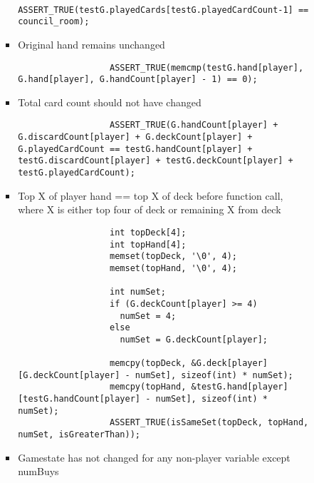 \documentclass[11pt,letterpaper]{article}
\begin{document}
\begin{enumerate}[label=\arabic*., leftmargin=*]
\begin{itemize}[leftmargin=*]
\begin{itemize}[leftmargin=*]
\begin{itemize}[leftmargin=*]
                  \begin{lstlisting}
                  ASSERT_TRUE(testG.playedCards[testG.playedCardCount-1] == council_room);
                  \end{lstlisting}
              \item Original hand remains unchanged

                  \begin{lstlisting}
                  ASSERT_TRUE(memcmp(testG.hand[player], G.hand[player], G.handCount[player] - 1) == 0);
                  \end{lstlisting}
              \item Total card count should not have changed

                  \begin{lstlisting}
                  ASSERT_TRUE(G.handCount[player] + G.discardCount[player] + G.deckCount[player] + G.playedCardCount == testG.handCount[player] + testG.discardCount[player] + testG.deckCount[player] + testG.playedCardCount);
                  \end{lstlisting}

              \item Top X of player hand == top X of deck before function call, where X is either top four of deck or remaining X from deck
                  \begin{lstlisting}
                  int topDeck[4];
                  int topHand[4];
                  memset(topDeck, '\0', 4);
                  memset(topHand, '\0', 4);

                  int numSet;
                  if (G.deckCount[player] >= 4)
                    numSet = 4;
                  else
                    numSet = G.deckCount[player];

                  memcpy(topDeck, &G.deck[player][G.deckCount[player] - numSet], sizeof(int) * numSet);
                  memcpy(topHand, &testG.hand[player][testG.handCount[player] - numSet], sizeof(int) * numSet);
                  ASSERT_TRUE(isSameSet(topDeck, topHand, numSet, isGreaterThan));
                  \end{lstlisting}

              \item Gamestate has not changed for any non-player variable except numBuys


\end{itemize}
\end{itemize}
\end{itemize}
\end{enumerate}
\end{document}

